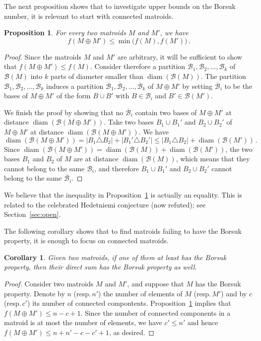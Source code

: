 \documentclass[12pt]{amsart}
\theoremstyle{plain}
\newtheorem{corollary}[theorem]{Corollary}
\newtheorem{proposition}[theorem]{Proposition}
\theoremstyle{definition}
\theoremstyle{remark}
\renewcommand{\le}{\leqslant}
\renewcommand{\leq}{\leqslant}
\newcommand{\diame}{\mathsf{diam}}
\def \diame {\operatorname{diam}}
\def \B {\mathcal{B}}
\begin{document}
The next proposition shows that to investigate upper bounds on the Borsuk number, it is relevant to start with connected matroids.

\begin{proposition}\label{prop:conn}
For every two matroids $M$ and $M'$, we have \[
f(M \oplus M') \le \min\bigl(f(M),f(M')\bigl) \, .
\] 
\end{proposition}

\begin{proof}
Since the matroids $M$ and $M'$ are arbitrary, it will be sufficient to show that $f(M \oplus M')\le f(M)$. Consider therefore a partition $\B_1,\B_2,\ldots,\B_k$ of $\B(M)$ into $k$ parts of diameter smaller than $\diame(\B(M))$. The partition $\B_1,\B_2,\ldots,\B_k$ induces a partition $\overline{\B}_1,\overline{\B}_2,\ldots,\overline{\B}_k$ of $M \oplus M'$ by setting $\overline{\B}_i$ to be the bases of $M \oplus M'$ of the form $B \cup B'$ with $B \in \B_i$ and $B' \in \B(M')$. 

We finish the proof by showing that no $\overline{\B}_i$ contain two bases of $M \oplus M'$ at distance $\diame(\B(M \oplus M'))$. Take two bases $B_1 \cup B_1'$ and $B_2 \cup B_2'$ of $M \oplus M'$ at distance $\diame(\B(M \oplus M'))$. We have
\[
\diame(\B(M \oplus M')) = |B_1 \triangle B_2| + |B_1' \triangle B_2'| \leq |B_1 \triangle B_2| + \diame(\B(M')) \, .
\]
Since $\diame(\B(M \oplus M')) = \diame(\B(M)) + \diame(\B(M'))$, the two bases $B_1$ and $B_2$ of $M$ are at distance $\diame(\B(M))$, which means that they cannot belong to the same $\B_i$, and therefore $B_1 \cup B_1'$ and $B_2 \cup B_2'$ cannot belong to the same $\overline{\B}_i$.
\end{proof}

We believe that the inequality in Proposition~\ref{prop:conn} is actually an equality. This is related to the celebrated Hedetniemi conjecture (now refuted); see Section~\ref{sec:open}.

The following corollary shows that to find matroids failing to have the Borsuk property, it is enough to focus on connected matroids.

\begin{corollary}\label{cor:conn}
Given two matroids, if one of them at least has the Borsuk property, then their direct sum has the Borsuk property as well.
\end{corollary}

\begin{proof}
Consider two matroids $M$ and $M'$, and suppose that $M$ has the Borsuk property. Denote by $n$ (resp.\,$n'$) the number of elements of $M$ (resp.\,$M'$) and by $c$ (resp.\,$c'$) its number of connected compontents. Proposition~\ref{prop:conn} implies that $f(M\oplus M') \leq n - c + 1$. Since the number of connected components in a matroid is at most the number of elements, we have $c' \leq n'$ and hence $f(M \oplus M') \leq n + n' - c - c' + 1$, as desired.
\end{proof}
\end{document}
